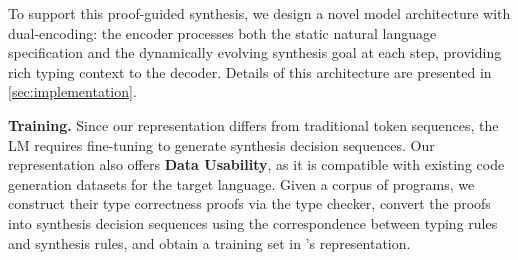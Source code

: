 To support this proof-guided synthesis, we design a novel model architecture with dual-encoding: the encoder processes both the static natural language specification and the dynamically evolving synthesis goal at each step, providing rich typing context to the decoder. Details of this architecture are presented in \autoref{sec:implementation}.

\smallskip \noindent \textbf{Training.} Since our representation differs from traditional token sequences, the LM requires fine-tuning to generate synthesis decision sequences.
%
Our representation also offers \textbf{Data Usability}, as it is compatible with existing code generation datasets for the target language.
Given a corpus of programs, we construct their type correctness proofs via the type checker, convert the proofs into synthesis decision sequences using the correspondence between typing rules and synthesis rules, and obtain a training set in \mainname's representation. 

